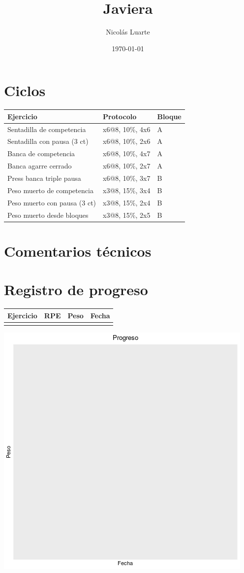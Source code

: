 \documentclass[11pt]{article}
\author{Nicolás Luarte}
\date{\today}
\title{Javiera}
\begin{document}
\maketitle
\tableofcontents

\section{Ciclos}
\label{sec:orga086c8f}
\begin{center}
\begin{tabular}{lll}
Ejercicio & Protocolo & Bloque\\
\hline
Sentadilla de competencia & x6@8, 10\%, 4x6 & A\\
Sentadilla con pausa (3 ct) & x6@8, 10\%, 2x6 & A\\
Banca de competencia & x6@8, 10\%, 4x7 & A\\
Banca agarre cerrado & x6@8, 10\%, 2x7 & A\\
\hline
Press banca triple pausa & x6@8, 10\%, 3x7 & B\\
Peso muerto de competencia & x3@8, 15\%, 3x4 & B\\
Peso muerto con pausa (3 ct) & x3@8, 15\%, 2x4 & B\\
Peso muerto desde bloques & x3@8, 15\%, 2x5 & B\\
\end{tabular}
\end{center}

\section{Comentarios técnicos}
\label{sec:orgd881742}
\section{Registro de progreso}
\label{sec:org3f0703d}
\begin{center}
\label{tab:org7397e3d}
\begin{tabular}{llll}
Ejercicio & RPE & Peso & Fecha\\
\hline
 &  &  & \\
\end{tabular}
\end{center}
\begin{center}
\includegraphics[width=.9\linewidth]{tmp.png}
\end{center}
\end{document}
